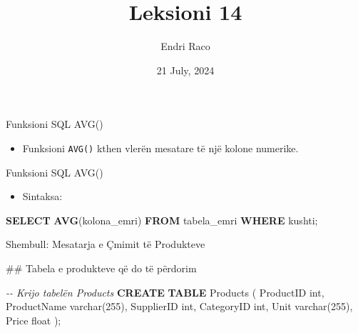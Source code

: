 \documentclass[
  ignorenonframetext,
]{beamer}
\title{Leksioni 14}
\author{Endri Raco}
\date{21 July, 2024}
\newenvironment{Shaded}{\begin{snugshade}}{\end{snugshade}}
\newcommand{\CommentTok}[1]{\textcolor[rgb]{0.56,0.35,0.01}{\textit{#1}}}
\newcommand{\DataTypeTok}[1]{\textcolor[rgb]{0.13,0.29,0.53}{#1}}
\newcommand{\DecValTok}[1]{\textcolor[rgb]{0.00,0.00,0.81}{#1}}
\newcommand{\FunctionTok}[1]{\textcolor[rgb]{0.13,0.29,0.53}{\textbf{#1}}}
\newcommand{\KeywordTok}[1]{\textcolor[rgb]{0.13,0.29,0.53}{\textbf{#1}}}
\newcommand{\NormalTok}[1]{#1}
\providecommand{\tightlist}{%
  \setlength{\itemsep}{0pt}\setlength{\parskip}{0pt}}
\begin{document}
\frame{\titlepage}

\begin{frame}[allowframebreaks]
  \tableofcontents[hideallsubsections]
\end{frame}
\section{}\label{section}

\begin{frame}[fragile]{Funksioni SQL AVG()}
\label{funksioni-sql-avg}
\begin{itemize}
\tightlist
\item
  Funksioni \texttt{AVG()} kthen vlerën mesatare të një kolone numerike.
\end{itemize}
\end{frame}

\begin{frame}[fragile]{Funksioni SQL AVG()}
\label{funksioni-sql-avg-1}
\begin{itemize}
\tightlist
\item
  Sintaksa:
\end{itemize}

\begin{Shaded}
\begin{Highlighting}[]
\KeywordTok{SELECT} \FunctionTok{AVG}\NormalTok{(kolona\_emri)}
\KeywordTok{FROM}\NormalTok{ tabela\_emri}
\KeywordTok{WHERE}\NormalTok{ kushti;}
\end{Highlighting}
\end{Shaded}
\end{frame}

\begin{frame}[fragile]{Shembull: Mesatarja e Çmimit të Produkteve}
\label{shembull-mesatarja-e-uxe7mimit-tuxeb-produkteve}

\begin{Shaded}
\begin{Highlighting}[]
\NormalTok{\#\# Tabela e produkteve që do të përdorim }

\CommentTok{{-}{-} Krijo tabelën Products}
\KeywordTok{CREATE} \KeywordTok{TABLE}\NormalTok{ Products (}
\NormalTok{    ProductID }\DataTypeTok{int}\NormalTok{,}
\NormalTok{    ProductName }\DataTypeTok{varchar}\NormalTok{(}\DecValTok{255}\NormalTok{),}
\NormalTok{    SupplierID }\DataTypeTok{int}\NormalTok{,}
\NormalTok{    CategoryID }\DataTypeTok{int}\NormalTok{,}
\NormalTok{    Unit }\DataTypeTok{varchar}\NormalTok{(}\DecValTok{255}\NormalTok{),}
\NormalTok{    Price }\DataTypeTok{float}
\NormalTok{);}
\end{Highlighting}
\end{Shaded}
\end{frame}
\end{document}
